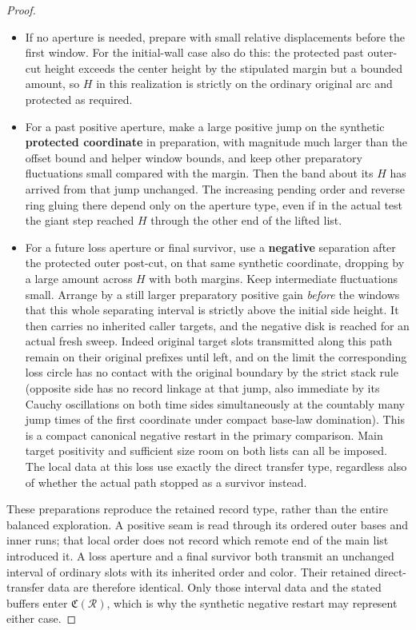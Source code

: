 \begin{proof}
\begin{itemize}
\item
  If no aperture is needed, prepare with small relative displacements before the first
  window. For the initial-wall case also do this: the protected past outer-cut height
  exceeds the center height by the stipulated margin but a bounded amount, so \(H\) in
  this realization is strictly on the ordinary original arc and protected as required.
\item
  For a past positive aperture, make a large positive jump on the synthetic
  \textbf{protected coordinate} in preparation, with magnitude much larger than the offset
  bound and helper window bounds, and keep other preparatory fluctuations small compared
  with the margin. Then the band about its \(H\) has arrived from that jump unchanged. The
  increasing pending order and reverse ring gluing there depend only on the aperture type,
  even if in the actual test the giant step reached \(H\) through the other end of the
  lifted list.
\item
  For a future loss aperture or final survivor, use a \textbf{negative} separation after
  the protected outer post-cut, on that same synthetic coordinate, dropping by a large
  amount across \(H\) with both margins. Keep intermediate fluctuations small. Arrange by
  a still larger preparatory positive gain \emph{before} the windows that this whole
  separating interval is strictly above the initial side height. It then carries no
  inherited caller targets, and the negative disk is reached for an actual fresh sweep.
  Indeed original target slots transmitted along this path remain on their original
  prefixes until left, and on the limit the corresponding loss circle has no contact with
  the original boundary by the strict stack rule (opposite side has no record linkage at
  that jump, also immediate by its Cauchy oscillations on both time sides simultaneously
  at the countably many jump times of the first coordinate under compact base-law
  domination). This is a compact canonical negative restart in the primary comparison.
  Main target positivity and sufficient size room on both lists can all be imposed. The
  local data at this loss use exactly the direct transfer type, regardless also of whether
  the actual path stopped as a survivor instead.
\end{itemize}

These preparations reproduce the retained record type, rather than the
entire balanced exploration. A positive seam is read through its ordered
outer bases and inner runs; that local order does not record which remote
end of the main list introduced it. A loss aperture and a final survivor
both transmit an unchanged interval of ordinary slots with its inherited
order and color. Their retained direct-transfer data are therefore identical.
Only those interval data and the stated buffers enter
$\mathfrak C(\mathcal R)$, which is why the synthetic negative restart may
represent either case.


\end{proof}
